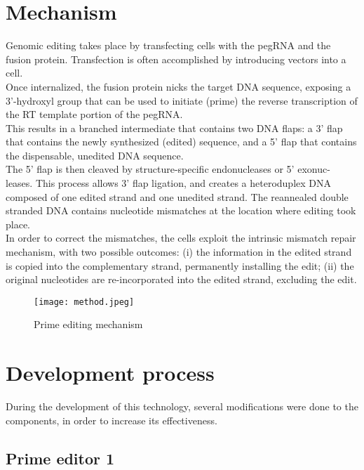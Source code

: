 \documentclass[a4paper,12pt]{extarticle}
\begin{document}
\section{Mechanism}

Genomic editing takes place by transfecting cells with the pegRNA and the fusion protein. Transfection is often accomplished by introducing vectors into a cell.\\

Once internalized, the fusion protein nicks the target DNA sequence, exposing a 3’-hydroxyl group that can be used to initiate (prime) the reverse transcription of the RT template portion of the pegRNA.\\

This results in a branched intermediate that contains two DNA flaps: a 3’ flap that contains the newly synthesized (edited) sequence, and a 5’ flap that contains the dispensable, unedited DNA sequence.\\

The 5’ flap is then cleaved by structure-specific endonucleases or 5’ exonuc- leases. This process allows 3’ flap ligation, and creates a heteroduplex DNA composed of one edited strand and one unedited strand. The reannealed double stranded DNA contains nucleotide mismatches at the location where editing took place.\\

In order to correct the mismatches, the cells exploit the intrinsic mismatch repair mechanism, with two possible outcomes: (i) the information in the edited strand is copied into the complementary strand, permanently installing the edit; (ii) the original nucleotides are re-incorporated into the edited strand, excluding the edit.\\

\begin{figure}[h]
\texttt{[image: method.jpeg]}
\centering
\caption{Prime editing mechanism}
\centering
\end{figure}

\section{Development process}

During the development of this technology, several modifications were done to the components, in order to increase its effectiveness.\\

\subsection{Prime editor 1}
\end{document}
